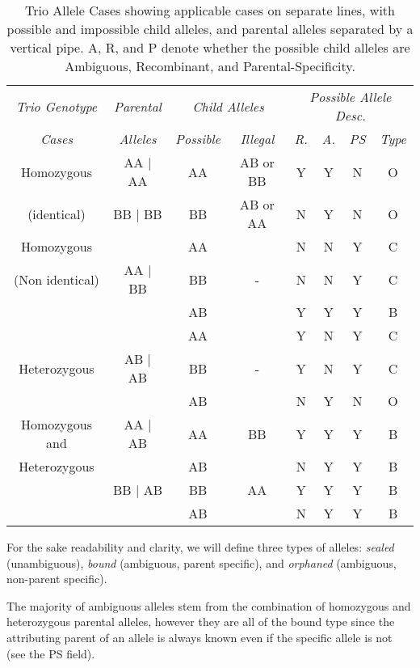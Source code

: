 \begin{table}[h]
\begin{center}
\begin{tabular}{ *8c } \toprule
\emph{Trio Genotype} & \emph{Parental} & \multicolumn{2}{c}{\emph{Child Alleles}} & \multicolumn{4}{c}{\emph{Possible Allele Desc.}} \\
\emph{Cases} & \emph{Alleles} & \emph{Possible} & \emph{Illegal} & \emph{R.} & \emph{A.} & \emph{PS} & \emph{Type} \\
\midrule
Homozygous  & AA | AA & AA & AB or BB & Y & Y & N & O \\
(identical) & BB | BB & BB & AB or AA & N & Y & N & O \\
\hline
Homozygous      &         & AA &    & N & N & Y & C\\
(Non identical) & AA | BB & BB & -  & N & N & Y & C\\
                &         & AB &    & Y & Y & Y & B\\
\hline
                &         & AA &    & Y & N & Y & C\\
Heterozygous    & AB | AB & BB & -  & Y & N & Y & C\\
                &         & AB &    & N & Y & N & O\\
\hline
Homozygous and  & AA | AB & AA & BB & Y & Y & Y & B\\
Heterozygous    &         & AB &    & N & Y & Y & B\\
                & BB | AB & BB & AA & Y & Y & Y & B\\
                &         & AB &    & N & Y & Y & B\\
\hline
\end{tabular}
\end{center}
\caption[Trio Allele Cases]{Trio Allele Cases showing applicable cases on separate lines, with possible and impossible child alleles, and parental alleles separated by a vertical pipe. A, R, and P denote whether the possible child alleles are Ambiguous, Recombinant, and Parental-Specificity.}\label{table:haplo:trioalleles}
\end{table}

For the sake readability and clarity, we will define three types of alleles: \textit{sealed} (unambiguous), \textit{bound} (ambiguous, parent specific), and \textit{orphaned} (ambiguous, non-parent specific).

The majority of ambiguous alleles stem from the combination of homozygous and heterozygous parental alleles, however they are all of the bound type since the attributing parent of an allele is always known even if the specific allele is not (see the PS field). 

